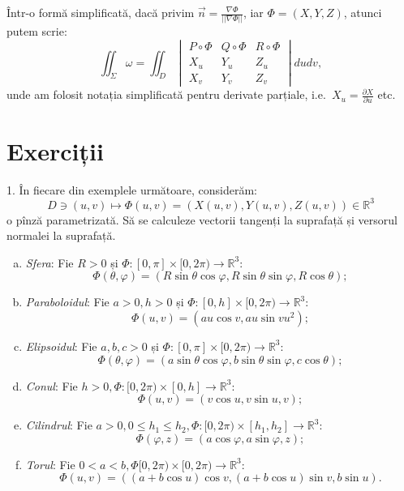 \documentclass[11pt,a4paper]{article}
\newcommand\RR{\mathbb{R}}
\theoremstyle{dotless}
\theoremstyle{dotlessdr}
\begin{document}
Într-o formă simplificată, dacă privim $\vec{n} = \frac{\nabla \Phi}{||\nabla \Phi||}$,
iar $\Phi = (X, Y, Z)$, atunci putem scrie:
\[
  \iint_\Sigma \omega = \iint_D
  \begin{vmatrix}
    P \circ \Phi & Q \circ \Phi & R \circ \Phi \\
    X_u & Y_u & Z_u \\
    X_v & Y_v & Z_v
  \end{vmatrix} dudv,
\]
unde am folosit notația simplificată pentru derivate parțiale, i.e.\
$X_u = \frac{\partial X}{\partial u}$ etc.


\section{Exerciții}
\label{sec:exc}

1. În fiecare din exemplele următoare, considerăm:
\[
  D \ni (u,v) \mapsto \Phi(u,v) = (X(u,v), Y(u,v), Z(u,v)) \in \RR^3
\]
o pînză parametrizată. Să se calculeze vectorii tangenți la suprafață și
versorul normalei la suprafață.

\begin{enumerate}[(a)]
\item \emph{Sfera}: Fie $R > 0$ și $\Phi : [0, \pi] \times [0, 2\pi) \to \RR^3$:
  \[
    \Phi(\theta, \varphi) = (R\sin \theta \cos \varphi, R \sin \theta \sin \varphi, R \cos \theta);
  \]
\item \emph{Paraboloidul}: Fie $a > 0, h > 0$ și $\Phi : [0, h] \times [0, 2\pi) \to \RR^3$:
  \[
    \Phi(u, v) = (au\cos v, au\sin v u^2);
  \]
\item \emph{Elipsoidul}: Fie $a, b, c > 0$ și $\Phi : [0, \pi] \times [0, 2\pi) \to \RR^3$:
  \[
    \Phi(\theta, \varphi) = (a \sin\theta \cos \varphi, b \sin \theta \sin \varphi, c \cos \theta);
  \]
\item \emph{Conul}: Fie $h > 0, \Phi : [0, 2\pi) \times [0, h] \to \RR^3$:
  \[
    \Phi(u, v) = (v \cos u, v \sin u, v);
  \]
\item \emph{Cilindrul}: Fie $a > 0, 0 \leq h_1 \leq h_2, \Phi : [0, 2\pi) \times [h_1, h_2] \to \RR^3$:
  \[
    \Phi(\varphi, z) = (a \cos \varphi, a \sin \varphi, z);
  \]
\item \emph{Torul}: Fie $0 < a < b, \Phi [0, 2\pi) \times [0, 2\pi) \to \RR^3$:
  \[
    \Phi(u, v) = ((a + b\cos u) \cos v, (a + b \cos u) \sin v, b \sin u).
  \]
\end{enumerate}
\end{document}
